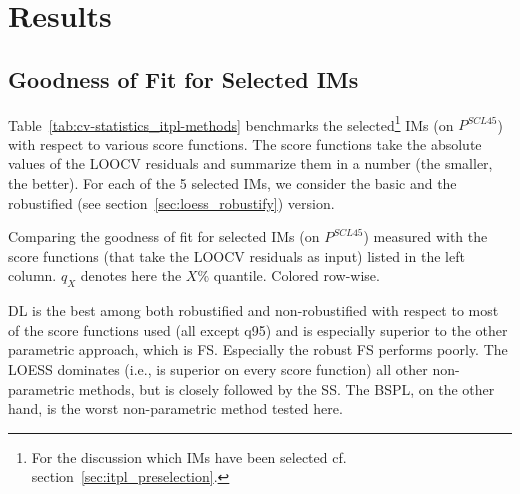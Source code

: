 \chapter{Results}\label{sec:results}

\section{Goodness of Fit for Selected {{IM}}s}{
	\label{sec:results_itpl}
	Table~\ref{tab:cv-statistics_itpl-methods} benchmarks the selected\footnote{\label{note:selected-IM} For the discussion which IMs have been selected cf. section~\ref{sec:itpl_preselection}.} {{IM}}s (on $P^{SCL45}$) with respect to various score functions. The score functions take the absolute values of the LOOCV residuals and summarize them in a number (the smaller, the better). For each of the 5 selected {{IM}}s, we consider the basic and the robustified (see section~\ref{sec:loess_robustify}) version.

	\begin{table}[h]
		\begin{center}
			\caption[Goodness of fit for {{IM}}s (on $P^{SCL45}$) measured with the score functions.]{Comparing the goodness of fit for selected {{IM}}s (on $P^{SCL45}$) measured with the score functions (that take the LOOCV residuals as input) listed in the left column. $q_X$ denotes here the $X\%$ quantile. Colored row-wise.}
			\scriptsize
			
			\normalsize
			\label{tab:cv-statistics_itpl-methods}
		\end{center}
	\end{table}
	
	DL is the best among both robustified and non-robustified with respect to most of the score functions used (all except q95) and is especially superior to the other parametric approach, which is FS. Especially the robust FS performs poorly. The LOESS dominates (i.e., is superior on every score function) all other non-parametric methods, but is closely followed by the SS. The BSPL, on the other hand, is the worst non-parametric method tested here. 
}


